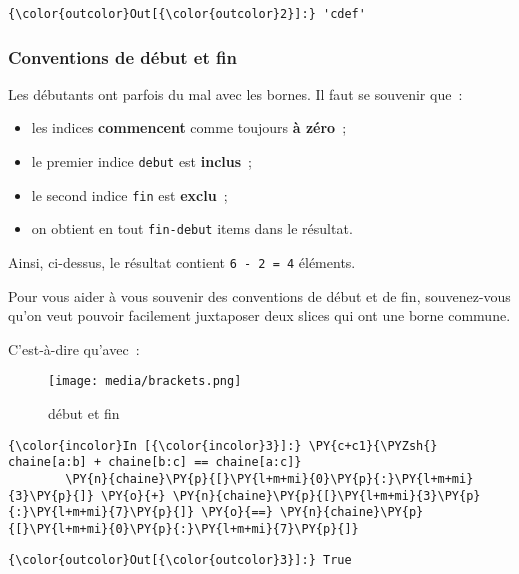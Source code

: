 \begin{Verbatim}[commandchars=\\\{\}]
{\color{outcolor}Out[{\color{outcolor}2}]:} 'cdef'
\end{Verbatim}
            
    \hypertarget{conventions-de-duxe9but-et-fin}{%
\subsubsection{Conventions de début et
fin}\label{conventions-de-duxe9but-et-fin}}

    Les débutants ont parfois du mal avec les bornes. Il faut se souvenir
que~:

\begin{itemize}
\tightlist
\item
  les indices \textbf{commencent} comme toujours \textbf{à zéro}~;
\item
  le premier indice \texttt{debut} est \textbf{inclus}~;
\item
  le second indice \texttt{fin} est \textbf{exclu}~;
\item
  on obtient en tout \texttt{fin-debut} items dans le résultat.
\end{itemize}

Ainsi, ci-dessus, le résultat contient \texttt{6\ -\ 2\ =\ 4} éléments.

    Pour vous aider à vous souvenir des conventions de début et de fin,
souvenez-vous qu'on veut pouvoir facilement juxtaposer deux slices qui
ont une borne commune.

C'est-à-dire qu'avec~:

    \begin{figure}
\centering
\texttt{[image: media/brackets.png]}
\caption{début et fin}
\end{figure}

    \begin{Verbatim}[commandchars=\\\{\}]
{\color{incolor}In [{\color{incolor}3}]:} \PY{c+c1}{\PYZsh{} chaine[a:b] + chaine[b:c] == chaine[a:c]}
        \PY{n}{chaine}\PY{p}{[}\PY{l+m+mi}{0}\PY{p}{:}\PY{l+m+mi}{3}\PY{p}{]} \PY{o}{+} \PY{n}{chaine}\PY{p}{[}\PY{l+m+mi}{3}\PY{p}{:}\PY{l+m+mi}{7}\PY{p}{]} \PY{o}{==} \PY{n}{chaine}\PY{p}{[}\PY{l+m+mi}{0}\PY{p}{:}\PY{l+m+mi}{7}\PY{p}{]}
\end{Verbatim}


\begin{Verbatim}[commandchars=\\\{\}]
{\color{outcolor}Out[{\color{outcolor}3}]:} True
\end{Verbatim}
            
